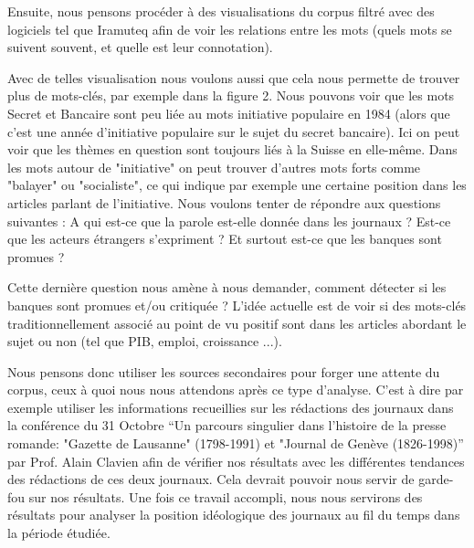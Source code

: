 \documentclass[11pt]{article}
\begin{document}
Ensuite, nous pensons procéder à des visualisations du corpus filtré avec des
logiciels tel que Iramuteq afin de voir les relations entre les mots (quels mots
se suivent souvent, et quelle est leur connotation).

Avec de telles visualisation nous voulons aussi que cela nous permette de
trouver plus de mots-clés, par exemple dans la figure 2. Nous pouvons voir que
les mots Secret et Bancaire sont peu liée au mots initiative populaire en 1984
(alors que c'est une année d'initiative populaire sur le sujet du secret
bancaire). Ici on peut voir que les thèmes en question sont toujours liés à la
Suisse en elle-même. Dans les mots autour de "initiative" on peut trouver
d'autres mots forts comme "balayer" ou "socialiste", ce qui indique par exemple
une certaine position dans les articles parlant de l'initiative.
\newpage
Nous voulons tenter de répondre aux questions suivantes : A qui est-ce que la
parole est-elle donnée dans les journaux ? Est-ce que les acteurs étrangers
s'expriment ? Et surtout est-ce que les banques sont promues ?

Cette dernière question nous amène à nous demander, comment détecter si les
banques sont promues et/ou critiquée ? L'idée actuelle est de voir si des
mots-clés traditionnellement associé au point de vu positif sont dans les
articles abordant le sujet ou non (tel que PIB, emploi, croissance ...).
    
Nous pensons donc utiliser les sources secondaires pour forger une attente du
corpus, ceux à quoi nous nous attendons après ce type d’analyse. C’est à dire
par exemple utiliser les informations recueillies sur les rédactions des
journaux dans la conférence du 31 Octobre “Un parcours singulier dans l'histoire
de la presse romande: "Gazette de Lausanne" (1798-1991) et "Journal de Genève
(1826-1998)” par Prof. Alain Clavien afin de vérifier nos résultats avec les
différentes tendances des rédactions de ces deux journaux. Cela devrait pouvoir
nous servir de garde-fou sur nos résultats. Une fois ce travail accompli, nous
nous servirons des résultats pour analyser la position idéologique des journaux
au fil du temps dans la période étudiée. 





\end{document}
